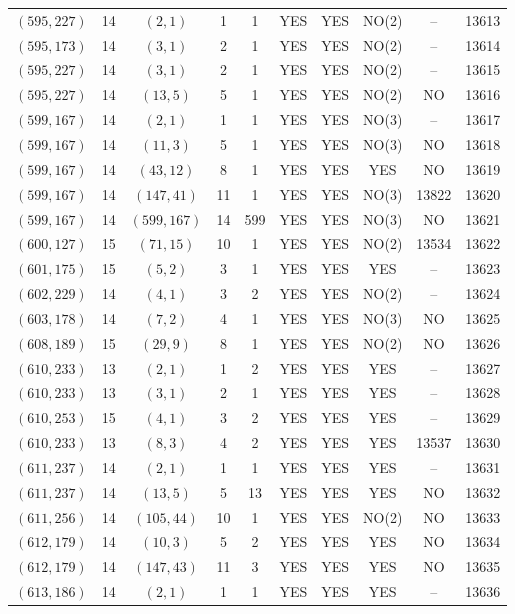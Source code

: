 \begin{longtable}{|c|c|c|c|c|c|c|c|c|c|}
$(595, 227)$ & 14 & $(2, 1)$ & 1 & 1 & YES & YES & NO(2) & -- & 13613\\
$(595, 173)$ & 14 & $(3, 1)$ & 2 & 1 & YES & YES & NO(2) & -- & 13614\\
$(595, 227)$ & 14 & $(3, 1)$ & 2 & 1 & YES & YES & NO(2) & -- & 13615\\
$(595, 227)$ & 14 & $(13, 5)$ & 5 & 1 & YES & YES & NO(2) & NO & 13616\\
$(599, 167)$ & 14 & $(2, 1)$ & 1 & 1 & YES & YES & NO(3) & -- & 13617\\
$(599, 167)$ & 14 & $(11, 3)$ & 5 & 1 & YES & YES & NO(3) & NO & 13618\\
$(599, 167)$ & 14 & $(43, 12)$ & 8 & 1 & YES & YES & YES & NO & 13619\\
$(599, 167)$ & 14 & $(147, 41)$ & 11 & 1 & YES & YES & NO(3) & 13822 & 13620\\
$(599, 167)$ & 14 & $(599, 167)$ & 14 & 599 & YES & YES & NO(3) & NO & 13621\\
$(600, 127)$ & 15 & $(71, 15)$ & 10 & 1 & YES & YES & NO(2) & 13534 & 13622\\
$(601, 175)$ & 15 & $(5, 2)$ & 3 & 1 & YES & YES & YES & -- & 13623\\
$(602, 229)$ & 14 & $(4, 1)$ & 3 & 2 & YES & YES & NO(2) & -- & 13624\\
$(603, 178)$ & 14 & $(7, 2)$ & 4 & 1 & YES & YES & NO(3) & NO & 13625\\
$(608, 189)$ & 15 & $(29, 9)$ & 8 & 1 & YES & YES & NO(2) & NO & 13626\\
$(610, 233)$ & 13 & $(2, 1)$ & 1 & 2 & YES & YES & YES & -- & 13627\\
$(610, 233)$ & 13 & $(3, 1)$ & 2 & 1 & YES & YES & YES & -- & 13628\\
$(610, 253)$ & 15 & $(4, 1)$ & 3 & 2 & YES & YES & YES & -- & 13629\\
$(610, 233)$ & 13 & $(8, 3)$ & 4 & 2 & YES & YES & YES & 13537 & 13630\\
$(611, 237)$ & 14 & $(2, 1)$ & 1 & 1 & YES & YES & YES & -- & 13631\\
$(611, 237)$ & 14 & $(13, 5)$ & 5 & 13 & YES & YES & YES & NO & 13632\\
$(611, 256)$ & 14 & $(105, 44)$ & 10 & 1 & YES & YES & NO(2) & NO & 13633\\
$(612, 179)$ & 14 & $(10, 3)$ & 5 & 2 & YES & YES & YES & NO & 13634\\
$(612, 179)$ & 14 & $(147, 43)$ & 11 & 3 & YES & YES & YES & NO & 13635\\
$(613, 186)$ & 14 & $(2, 1)$ & 1 & 1 & YES & YES & YES & -- & 13636\\

\end{longtable}
